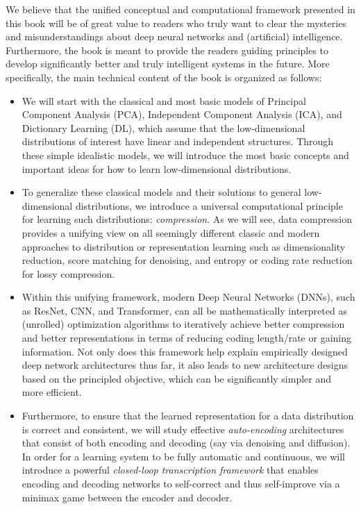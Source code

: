 \documentclass[../../book-main.tex]{subfiles}
\begin{document}
We believe that the unified conceptual and computational framework presented in this book will be of great value to readers who truly want to clear the mysteries and misunderstandings about deep neural networks and (artificial) intelligence. Furthermore, the book is meant to provide the readers guiding principles to develop significantly better and truly intelligent systems in the future. More specifically, the main technical content of the book is organized as follows:
\begin{itemize}
\item We will start with the classical and most basic models of Principal Component Analysis (PCA), Independent Component Analysis (ICA), and Dictionary Learning (DL), which assume that the low-dimensional distributions of interest have linear and independent structures. Through these simple idealistic models, we will introduce the most basic concepts and  important ideas for how to learn low-dimensional distributions.

\item To generalize these classical models and their solutions to general low-dimensional distributions, we introduce a universal computational principle for learning such distributions: {\em compression}. As we will see, data compression provides a unifying view on all seemingly different classic and modern approaches to distribution or representation learning such as dimensionality reduction, score matching for denoising, and entropy or coding rate reduction for lossy compression. 

\item Within this unifying framework, modern Deep Neural Networks (DNNs), such as ResNet, CNN, and Transformer, can all be mathematically interpreted as (unrolled) optimization algorithms to iteratively achieve better compression and better representations in terms of reducing coding length/rate or gaining information. Not only does this framework help explain empirically designed deep network architectures thus far, it also leads to new architecture designs based on the principled objective, which can be significantly simpler and more efficient.

\item Furthermore, to ensure that the learned representation for a data distribution is correct and consistent, we will study effective {\em auto-encoding} architectures that consist of both encoding and decoding (say via denoising and diffusion). In order for a learning system to be fully automatic and continuous, we will introduce a powerful {\em closed-loop transcription framework} that enables encoding and decoding networks to self-correct and thus self-improve via a minimax game between the encoder and decoder.  


\end{itemize}
\end{document}
